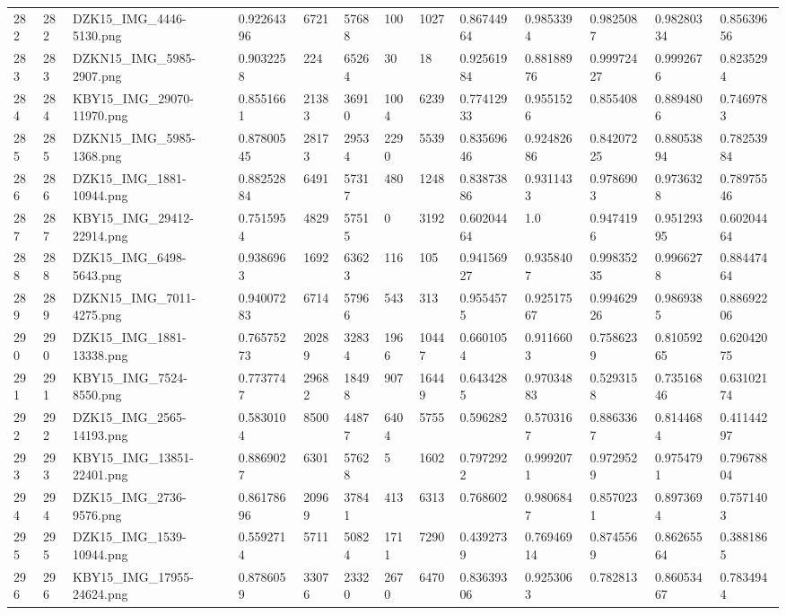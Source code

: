 \documentclass[11pt, a4paper, twoside]{report}
\begin{document}
\begin{longtable}[c]{@{}lllllllllllll@{}}
282 & 282 & DZK15\_IMG\_4446-5130.png & 0.92264396 & 6721 & 57688 & 100 & 1027 & 0.86744964 & 0.9853394 & 0.9825087 & 0.98280334 & 0.85639656 \\
283 & 283 & DZKN15\_IMG\_5985-2907.png & 0.9032258 & 224 & 65264 & 30 & 18 & 0.92561984 & 0.88188976 & 0.99972427 & 0.9992676 & 0.8235294 \\
284 & 284 & KBY15\_IMG\_29070-11970.png & 0.8551661 & 21383 & 36910 & 1004 & 6239 & 0.77412933 & 0.9551526 & 0.855408 & 0.8894806 & 0.7469783 \\
285 & 285 & DZKN15\_IMG\_5985-1368.png & 0.87800545 & 28173 & 29534 & 2290 & 5539 & 0.83569646 & 0.92482686 & 0.84207225 & 0.88053894 & 0.78253984 \\
286 & 286 & DZK15\_IMG\_1881-10944.png & 0.88252884 & 6491 & 57317 & 480 & 1248 & 0.83873886 & 0.9311433 & 0.9786903 & 0.9736328 & 0.78975546 \\
287 & 287 & KBY15\_IMG\_29412-22914.png & 0.7515954 & 4829 & 57515 & 0 & 3192 & 0.60204464 & 1.0 & 0.9474196 & 0.95129395 & 0.60204464 \\
288 & 288 & DZK15\_IMG\_6498-5643.png & 0.9386963 & 1692 & 63623 & 116 & 105 & 0.94156927 & 0.9358407 & 0.99835235 & 0.9966278 & 0.88447464 \\
289 & 289 & DZKN15\_IMG\_7011-4275.png & 0.94007283 & 6714 & 57966 & 543 & 313 & 0.9554575 & 0.92517567 & 0.99462926 & 0.9869385 & 0.88692206 \\
290 & 290 & DZK15\_IMG\_1881-13338.png & 0.76575273 & 20289 & 32834 & 1966 & 10447 & 0.6601054 & 0.9116603 & 0.7586239 & 0.81059265 & 0.62042075 \\
291 & 291 & KBY15\_IMG\_7524-8550.png & 0.7737747 & 29682 & 18498 & 907 & 16449 & 0.6434285 & 0.97034883 & 0.5293158 & 0.73516846 & 0.63102174 \\
292 & 292 & DZK15\_IMG\_2565-14193.png & 0.5830104 & 8500 & 44877 & 6404 & 5755 & 0.596282 & 0.5703167 & 0.8863367 & 0.8144684 & 0.41144297 \\
293 & 293 & KBY15\_IMG\_13851-22401.png & 0.8869027 & 6301 & 57628 & 5 & 1602 & 0.7972922 & 0.9992071 & 0.9729529 & 0.9754791 & 0.79678804 \\
294 & 294 & DZK15\_IMG\_2736-9576.png & 0.86178696 & 20969 & 37841 & 413 & 6313 & 0.768602 & 0.9806847 & 0.8570231 & 0.8973694 & 0.7571403 \\
295 & 295 & DZK15\_IMG\_1539-10944.png & 0.5592714 & 5711 & 50824 & 1711 & 7290 & 0.4392739 & 0.76946914 & 0.8745569 & 0.86265564 & 0.3881865 \\
296 & 296 & KBY15\_IMG\_17955-24624.png & 0.8786059 & 33076 & 23320 & 2670 & 6470 & 0.83639306 & 0.9253063 & 0.782813 & 0.86053467 & 0.7834944 \\

\end{longtable}
\end{document}
